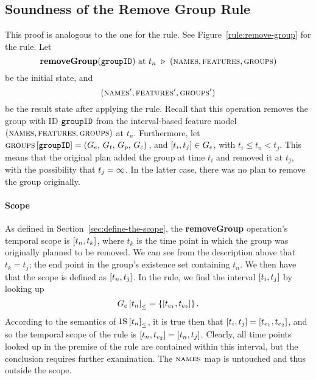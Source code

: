 \subsection{Soundness of the Remove Group Rule}
\label{sub:soundness-of-the-remove-group-rule}
This proof is analogous to the one for the  rule.
See Figure~\vref{rule:remove-group} for the  rule. Let
\[
      \textbf{removeGroup}(\texttt{groupID}) \text{ at } t_n \ \triangleright \  (\textsc{names}, \textsc{features}, \textsc{groups}{})
\]
be the initial state, and
\[
   (\textsc{names}', \textsc{features}', \textsc{groups}{}')
\]
be the result state after applying the  rule. Recall that this operation removes the group with ID $\texttt{groupID}$ from the interval-based feature model $(\textsc{names}, \textsc{features}, \textsc{groups}{})$ at $t_n$. Furthermore, let $\textsc{groups}{} \left[ \texttt{groupID} \right] = \left(G_e,\, G_t,\, G_p,\, G_c\right){}$, and $\interval{t_i}{t_j} \in G_e$, with $t_i \leq t_n < t_j$. This means that the original plan added the group at time $t_i$ and removed it at $t_j$, with the possibility that $t_j = \infty$. In the latter case, there was no plan to remove the group originally.

\paragraph{Scope}

As defined in Section~\vref{sec:define-the-scope}, the \textbf{removeGroup} operation's temporal scope is $\interval{t_n}{t_k}$, where $t_k$ is the time point in which the group was originally planned to be removed. We can see from the description above that $t_k = t_j$; the end point in the group's existence set containing $t_n$. We then have that the scope is defined as $\interval{t_n}{t_j}$. In the rule, we find the interval $\interval{t_i}{t_j}$ by looking up
\[
   \containing{G_e}{t_n} = \set{\interval{t_{e_1}}{t_{e_2}}}.
\]
According to the semantics of ${\textsc{IS} \left[ t_n \right]}_{\leq}$, it is true then that $\interval{t_i}{t_j} = \interval{t_{e_1}}{t_{e_2}}$, and so the temporal scope of the rule is $\interval{t_n}{t_{e_2}} = \interval{t_n}{t_j}$. Clearly, all time points looked up in the premise of the rule are contained within this interval, but the conclusion requires further examination. The $\textsc{names}{}$ map is untouched and thus outside the scope. 

